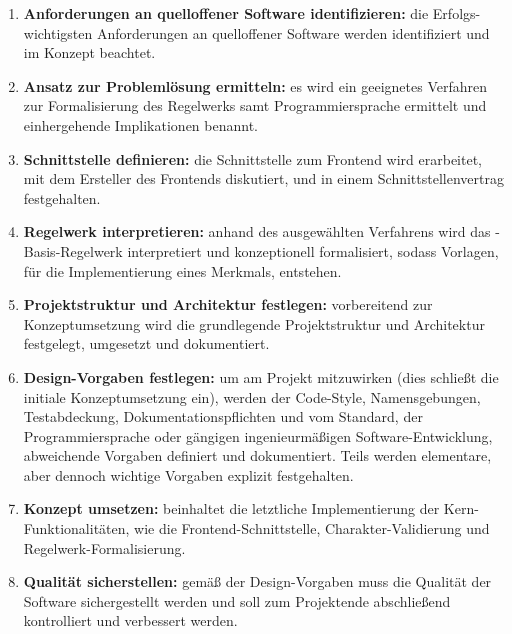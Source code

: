 \begin{enumerate}[leftmargin=1.5em,label={\textbf{\alph*)}}]
    \item \textbf{Anforderungen an quelloffener Software identifizieren:} die Erfolgs-wichtigsten Anforderungen an quelloffener Software werden identifiziert und im Konzept beachtet.
    \item \textbf{Ansatz zur Problemlösung ermitteln:} es wird \uA ein geeignetes Verfahren zur Formalisierung des Regelwerks samt Programmiersprache ermittelt und einhergehende Implikationen benannt.
    \item \textbf{Schnittstelle definieren:} die Schnittstelle zum Frontend wird erarbeitet, \ggf mit dem Ersteller des Frontends diskutiert, und in einem Schnittstellenvertrag festgehalten.
    \item \textbf{Regelwerk interpretieren:} anhand des ausgewählten Verfahrens wird das -Basis-Regelwerk interpretiert und konzeptionell formalisiert, sodass Vorlagen, \zB für die Implementierung eines Merkmals, entstehen.
    \item \textbf{Projektstruktur und Architektur festlegen:} vorbereitend zur Konzeptumsetzung wird die grundlegende Projektstruktur und Architektur festgelegt, umgesetzt und dokumentiert.
    \item \textbf{Design-Vorgaben festlegen:} um am Projekt mitzuwirken (dies schließt die initiale Konzeptumsetzung ein), werden \uA der Code-Style, Namensgebungen, Testabdeckung, Dokumentationspflichten und \ggf vom Standard, \zB der Programmiersprache oder gängigen ingenieurmäßigen Software-Entwicklung, abweichende Vorgaben definiert und dokumentiert.
    Teils werden elementare, aber dennoch wichtige Vorgaben explizit festgehalten.
    \item \textbf{Konzept umsetzen:} beinhaltet die letztliche Implementierung der Kern-Funktionalitäten, wie die Frontend-Schnittstelle, Charakter-Validierung und Regelwerk-Formalisierung.
    \item \textbf{Qualität sicherstellen:} gemäß der Design-Vorgaben muss die Qualität der Software sichergestellt werden und soll zum Projektende abschließend kontrolliert und \ggf verbessert werden.
\end{enumerate}
